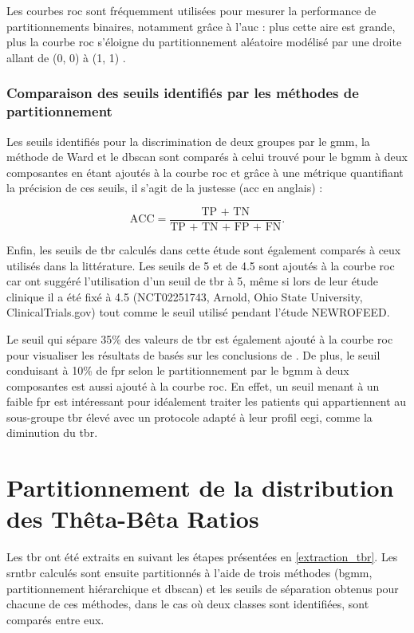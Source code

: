 Les courbes \gls{roc} sont fréquemment utilisées pour mesurer la performance de partitionnements binaires, notamment grâce à
l'\gls{auc} : plus cette aire est grande, plus la courbe \gls{roc} s'éloigne du partitionnement aléatoire modélisé par une droite allant
de (0, 0) à (1, 1) \citep[Chapitre~3]{James2013}. 

\subsubsection{Comparaison des seuils identifiés par les méthodes de partitionnement}
Les seuils identifiés pour la discrimination de deux groupes par le \gls{gmm}, la méthode de Ward et le \gls{dbscan} sont comparés à celui trouvé pour 
le \gls{bgmm} à deux composantes en étant ajoutés à la courbe \gls{roc} et grâce à une métrique quantifiant la précision de ces seuils, 
il s'agit de la justesse (\gls{acc} en anglais) :

\begin{equation}
\label{eq:tbr_accuracy}
\text{ACC} = \frac{\text{TP + TN}}{\text{TP + TN + FP + FN}}.
\end{equation}

Enfin, les seuils de \gls{tbr} calculés dans cette étude sont également comparés à ceux utilisés dans la littérature. Les seuils de 5 et de 4.5 sont
ajoutés à la courbe \gls{roc} car \citet{Kerson2013} ont suggéré l'utilisation d'un seuil de \gls{tbr} à 5, même si lors de leur étude clinique il a été fixé 
à 4.5 (NCT02251743, Arnold, Ohio State University, ClinicalTrials.gov) tout comme le seuil utilisé pendant l'étude NEWROFEED. 

Le seuil qui sépare 35\% des valeurs de 
\gls{tbr} est également ajouté à la courbe \gls{roc} pour visualiser les résultats de \citet{Zhang2017} basés sur les conclusions de \citet{Clarke2011}.
De plus, le seuil conduisant à 10\% de \gls{fpr} selon le partitionnement par le \gls{bgmm} à deux composantes est aussi ajouté à la courbe \gls{roc}. 
En effet, un seuil menant à un faible \gls{fpr} est intéressant pour idéalement traiter les patients qui appartiennent au sous-groupe \gls{tbr} élevé avec 
un protocole adapté à leur profil \gls{eegi}, comme la diminution du \gls{tbr}.

\section{Partitionnement de la distribution des Thêta-Bêta Ratios}

Les \gls{tbr} ont été extraits en suivant les étapes présentées en \ref{extraction_tbr}. Les \gls{srntbr} calculés sont ensuite partitionnés à l'aide de trois
méthodes (\gls{bgmm}, partitionnement hiérarchique et \gls{dbscan}) et les seuils de séparation obtenus pour chacune de ces méthodes, dans le cas où deux classes sont 
identifiées, sont comparés entre eux.  

